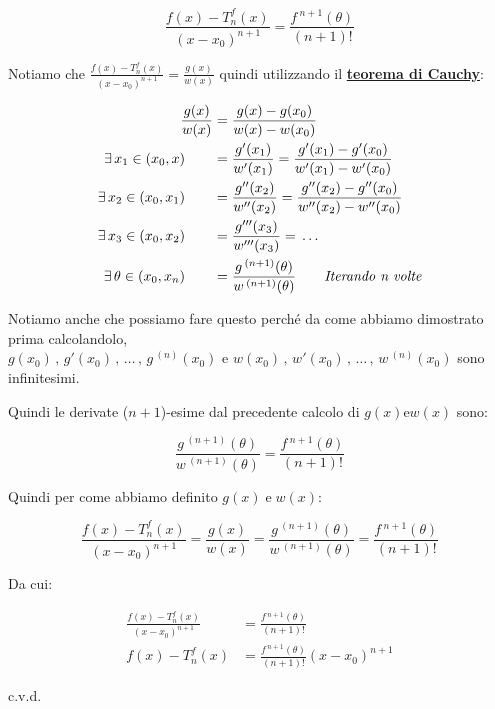 \documentclass[../dimostrazioni]{subfiles}
\begin{document}
            \[  \frac{f(x) - T _n ^ f (x)}{(x-x_0)^{n+1}} = \frac{f\,^{n+1}(\theta)}{(n+1)!}    \]

            Notiamo che \(  \frac{f(x) - T _n ^ f (x)}{(x-x_0)^{n+1}} = \frac{g(x)}{w(x)}    \) quindi utilizzando il \textbf{\hyperref[teoCauchy]{teorema di Cauchy}}:

            \begin{align*}
                \frac{g(x)}{w(x)} &= \frac{g(x) - g(x_0)}{w(x) - w(x_0)}\\
                \exists \, x_1 \in (x_0, x) \qquad &= \frac{g'(x_1)}{w'(x_1)} = \frac{g'(x_1) - g'(x_0)}{w'(x_1) - w'(x_0)}\\
                \exists \, x_2 \in (x_0, x_1) \qquad &= \frac{g''(x_2)}{w''(x_2)} = \frac{g''(x_2) - g''(x_0)}{w''(x_2) - w''(x_0)}\\
                \exists \, x_3 \in (x_0, x_2) \qquad &= \frac{g'''(x_3)}{w'''(x_3)} = \, \dots\\
                \exists \, \theta \in (x_0, x_n) \qquad &= \frac{g\,^{(n+1)}(\theta)}{w\,^{(n+1)}(\theta)} \qquad \text{\emph{Iterando n volte}}
            \end{align*}

            Notiamo anche che possiamo fare questo perché da come abbiamo dimostrato prima calcolandolo,\\
            \(g(x_0)\,,\, g'(x_0)\,,\, \dots\,,\, g\,^{(n)} (x_0) \) e \( w(x_0)\,,\, w'(x_0)\,,\, \dots\,,\, w\,^{(n)} (x_0)\) sono infinitesimi.\\

            \newpage
            
            Quindi le derivate (\(n+1\))-esime dal precedente calcolo di \(g(x) \text{e} w(x)\) sono:

            \[  \frac{g\,^{(n+1)}(\theta)}{w\,^{(n+1)}(\theta)} = \frac{f\,^{n+1}(\theta)}{(n+1)!} \]

            Quindi per come abbiamo definito \(g(x) \; \text{e} \; w(x)\):

            \[  \frac{f(x) - T _n ^ f (x)}{(x-x_0)^{n+1}} = \frac{g(x)}{w(x)} = \frac{g\,^{(n+1)}(\theta)}{w\,^{(n+1)}(\theta)} = \frac{f\,^{n+1}(\theta)}{(n+1)!}   \]

            Da cui:

            \begin{align*}
                \frac{f(x) - T _n ^ f (x)}{(x-x_0)^{n+1}} &= \frac{f\,^{n+1}(\theta)}{(n+1)!}\\
                f(x) - T _n ^ f (x) &= \frac{f\,^{n+1}(\theta)}{(n+1)!}(x-x_0)^{n+1}
            \end{align*}

            c.v.d.
        
\end{document}
